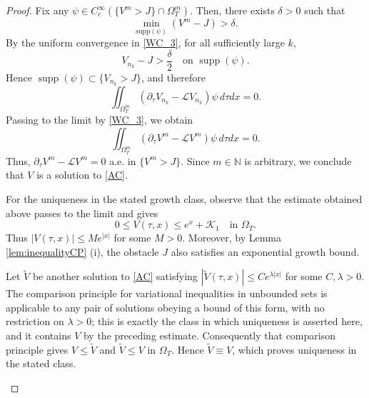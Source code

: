 \documentclass[11pt, a4paper, leqno]{amsart}
\numberwithin{equation}{section}
\theoremstyle{plain}
\theoremstyle{definition}
\theoremstyle{remark}
\def\leq{\leqslant}
\begin{document}
\begin{proof}
Fix any $\psi\in C_c^\infty(\{V^m>J\}\cap\Omega^m_T)$.
Then, there exists $\delta>0$ such that
\[\min\limits_{\text{supp}(\psi)}(V^m-J)>\delta.\]
{
By the uniform convergence in \eqref{WC_3}, for all sufficiently
large $k$,
\[
    V_{n_k}-J>\frac{\delta}{2}
    \quad\text{on }\operatorname{supp}(\psi).
\]
Hence
$\operatorname{supp}(\psi)\subset\{V_{n_k}>J\}$, and therefore
\[
   \iint_{\Omega^m_T}
   (\partial_\tau V_{n_k}-\mathcal{L}V_{n_k})
   \psi \, d\tau dx=0.
\]
Passing to the limit by \eqref{WC_3}, we obtain
\[
   \iint_{\Omega^m_T}
   (\partial_\tau V^m-\mathcal{L}V^m)
   \psi\, d\tau dx=0.
\]
}
Thus, $\partial_\tau V^m -\mathcal{L}V^m=0$ a.e. in $\{V^m>J\}$. 
Since $m\in\mathbb{N}$ is arbitrary, we conclude that $V$ is a solution to \eqref{AC}.

{
For the uniqueness in the stated growth class, observe that the
estimate obtained above passes to the limit and gives
\[
    0\leq V(\tau,x)\leq e^x+\mathcal K_1
    \quad\text{in }\Omega_T.
\]
Thus $|V(\tau,x)|\leq M e^{|x|}$ for some $M>0$.
Moreover, by Lemma \ref{lem:inequalityCP} (i), the obstacle $J$
also satisfies an exponential growth bound.

Let $\widetilde V$ be another solution to \eqref{AC} satisfying
$|\widetilde V(\tau,x)|\leq C e^{\lambda|x|}$ for some
$C,\lambda>0$.
{
The comparison principle \cite[Theorem 1.2]{YY08} for variational
inequalities in unbounded sets is applicable to any pair of solutions
obeying a bound of this form, with no restriction on $\lambda>0$;
this is exactly the class in which uniqueness is asserted here, and it
contains $V$ by the preceding estimate.
Consequently that comparison principle gives}
$V\leq\widetilde V$ and $\widetilde V\leq V$ in $\Omega_T$.
Hence $\widetilde V\equiv V$, which proves uniqueness in the stated
class.
}
\label{rev:construction-end}
\end{proof}
\end{document}
